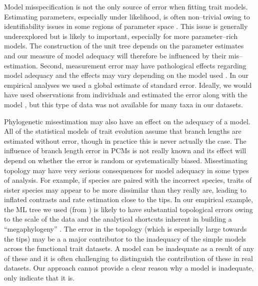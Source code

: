 \documentclass[a4paper,12pt]{article}
\begin{document}
Model misspecification is not the only source of error when fitting trait models. Estimating parameters, especially under likelihood, is often non--trivial owing to identifiability issues in some regions of parameter space \citep{Ane2008, HoAne2012}. This issue is generally underexplored but is likely to important, especially for more parameter--rich models. The construction of the unit tree depends on the parameter estimates and our measure of model adequacy will therefore be influenced by their mis--estimation. Second, measurement error may have pathological effects regarding model adequacy and the effects may vary depending on the model used \citep{PennellPE}. In our empirical analyses we used a global estimate of standard error. Ideally, we would have used observations from individuals and estimated the error along with the model \citep{Ives2007, Felsenstein2008,  Hansen2012}, but this type of data was not available for many taxa in our datasets. 

Phylogenetic misestimation may also have an effect on the adequacy of a model. All of the statistical models of trait evolution assume that branch lengths are estimated without error, though in practice this is never actually the case. The influence of branch length error in PCMs is not really known and its effect will depend on whether the error is random or systematically biased. Misestimating topology may have very serious consequences for model adequacy in some types of analysis. For example, if species are paired with the incorrect species, traits of sister species may appear to be more dissimilar than they really are, leading to inflated contrasts and rate estimation close to the tips. In our empirical example, the ML tree we used (from \citep{Zanne2013}) is likely to have substantial topological errors owing to the scale of the data and the analytical shortcuts inherent in building a ``megaphylogeny'' \citep{Smith2009}. The error in the topology (which is especially large towards the tips) may be a a major contributor to the inadequacy of the simple models across the functional trait datasets. 
A model can be inadequate as a result of any of these and it is often challenging to distinguish the contribution of these in real datasets. Our approach cannot provide a clear reason why a model is inadequate, only indicate that it is.
\end{document}
